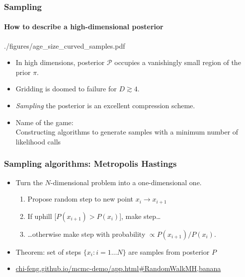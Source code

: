 \documentclass[%
]{beamer}
\newcommand{\posterior}{\mathcal{P}}
\newcommand{\prior}{\pi}
\begin{document}
\begin{frame}
    \frametitle{Sampling}
    \framesubtitle{How to describe a high-dimensional posterior}

    \begin{figright}[0.4]{./figures/age_size_curved_samples.pdf}
		\begin{itemize}
          \item In high dimensions, posterior $\posterior$ occupies a vanishingly small region of the prior $\prior$.
          \item Gridding is doomed to failure for $D\gtrsim4$.
          \item {\em Sampling\/} the posterior is an excellent compression scheme.
          \item Name of the game: \\ Constructing algorithms to generate samples with a minimum number of likelihood calls
		\end{itemize}
	\end{figright}
\end{frame}



%
%
\begin{frame}
    \frametitle{Sampling algorithms: Metropolis Hastings} 
    \begin{itemize}

        \item Turn the $N$-dimensional problem into a one-dimensional one.
            \begin{enumerate}
                \item Propose random step to new point $x_{i} \to x_{i+1}$
                \item If uphill [$P(x_{i+1})>P(x_i)$], make step\ldots
                \item \ldots otherwise make step with probability $\propto P(x_{i+1})/P(x_i)$. 
            \end{enumerate}
        \item Theorem: set of steps $\{x_i : i=1\ldots N\}$ are samples from posterior $P$
        \item \href{https://chi-feng.github.io/mcmc-demo/app.html\#RandomWalkMH,banana}{chi-feng.github.io/mcmc-demo/app.html\#RandomWalkMH,banana}
    \end{itemize}

\end{frame}
\end{document}
